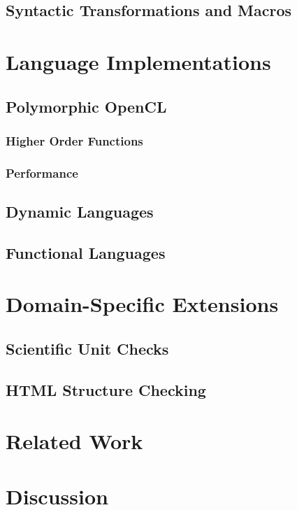 \documentclass{sigplanconf}
\begin{document}
\subsection{Syntactic Transformations and Macros}

\section{Language Implementations}
\subsection{Polymorphic OpenCL}

\subsubsection{Higher Order Functions}

\subsubsection{Performance}

\subsection{Dynamic Languages}

\subsection{Functional Languages}

\section{Domain-Specific Extensions}
\subsection{Scientific Unit Checks}
\subsection{HTML Structure Checking}
\section{Related Work}
\section{Discussion}
%
\end{document}
